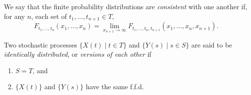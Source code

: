 \documentclass[12pt]{article}
\begin{document}
We say that the finite probability distributions are \emph{consistent} with one another if, for any $n$, each set of $t_1,\ldots,t_{n+1}\in T$,
$$F_{t_1,\ldots,t_n}(x_1,\ldots,x_n)=\lim_{x_{n+1}\to\infty}F_{t_1,\ldots,t_n,t_{n+1}}(x_1,\ldots,x_n,x_{n+1}).$$

Two stochastic processes $\lbrace X(t) \mid t\in T \rbrace$ and $\lbrace Y(s) \mid s\in S \rbrace$ are said to be \emph{identically distributed}, or \emph{versions of each other} if
\begin{enumerate}
\item $S=T$, and
\item $\lbrace X(t)\rbrace$ and $\lbrace Y(s)\rbrace$ have the same f.f.d.
\end{enumerate}
\end{document}
